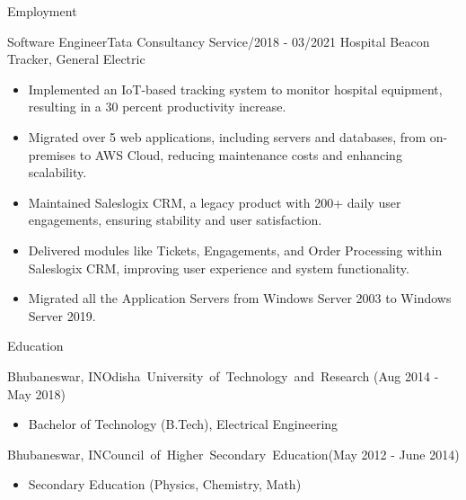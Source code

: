 \documentclass[]{mcdowellcv}
\begin{document}
\begin{cvsection}{Employment}
        \begin{cvsubsection}{Software Engineer}{Tata Consultancy Service}{/2018 - 03/2021}
            Hospital Beacon Tracker, General Electric
            \begin{itemize}
                \item Implemented an IoT-based tracking system to monitor hospital equipment, resulting in a 30 percent productivity increase.
                \item Migrated over 5 web applications, including servers and databases, from on-premises to AWS Cloud, reducing maintenance costs and enhancing scalability.
                \item Maintained Saleslogix CRM, a legacy product with 200+ daily user engagements, ensuring stability and user satisfaction.
                \item Delivered modules like Tickets, Engagements, and Order Processing within Saleslogix CRM, improving user experience and system functionality.
                \item Migrated all the Application Servers from Windows Server 2003 to Windows Server 2019.
            \end{itemize}
        \end{cvsubsection}
    \end{cvsection}

    \begin{cvsection}{Education}
        \begin{cvsubsection}{Bhubaneswar, IN}{\mbox{Odisha University of Technology and Research}}{ (Aug 2014 - May 2018)}
            \begin{itemize}
                \item Bachelor of Technology (B.Tech), Electrical Engineering
            \end{itemize}
        \end{cvsubsection}
        \begin{cvsubsection}{Bhubaneswar, IN}{\mbox{Council of Higher Secondary Education}}{(May 2012 - June 2014)}
            \begin{itemize}
                \item Secondary Education (Physics, Chemistry, Math)
            \end{itemize}
        \end{cvsubsection}
    \end{cvsection}
\end{document}
